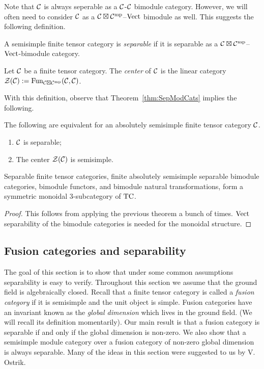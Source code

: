 \documentclass{amsart}
\begin{document}
Note that $\mathcal C$ is always seperable as a $\mathcal C$-$\mathcal C$ bimodule category.  However, we will often need to consider $\mathcal C$ as a $\mathcal C \boxtimes \mathcal C^{\mathrm{mp}}$--$\mathrm{Vect}$ bimodule as well.  This suggests the following definition.

\begin{definition}
	A semisimple finite tensor category is {\em separable} if it is separable as a $\mathcal C \boxtimes \mathcal C^{\mathrm{mp}}$--$\mathrm{Vect}$-bimodule category.  
\end{definition}


\begin{definition}
	Let $\mathcal C$ be a finite tensor category. The {\em center} of $\mathcal C$ is the linear category $\mathcal Z(\mathcal C) := \operatorname{Fun}_{\mathcal C \boxtimes \mathcal C^{\mathrm{mp}}}(\mathcal C, \mathcal C)$.
\end{definition}

With this definition, observe that Theorem~\ref{thm:SepModCats} implies the following.

\begin{corollary} \label{cor:Sep=semisimplecenter}
	The following are equivalent for an absolutely semisimple finite tensor category $\mathcal C$.
	\begin{enumerate}
		\item $\mathcal C$ is separable;
		\item The center $\mathcal Z(\mathcal C)$ is semisimple.
	\end{enumerate} 
\end{corollary}

\begin{theorem} \label{thm:closure-of-separability}
Separable finite tensor categories, finite absolutely semisimple separable bimodule categories, bimodule functors, and bimodule natural transformations, form a symmetric monoidal $3$-subcategory of $\mathrm{TC}$.
\end{theorem}
\begin{proof}
This follows from applying the previous theorem a bunch of times.  $\mathrm{Vect}$ separability of the bimodule categories is needed for the monoidal structure.  
\end{proof}


\subsection{Fusion categories and separability} \label{sec:tc-fusion}

The goal of this section is to show that under some common assumptions separability is easy to verify.  Throughout this section we assume that the ground field is algebraically closed.  Recall that a finite tensor category is called a \emph{fusion category} if it is semisimple and the unit object is simple.  Fusion categories have an invariant known as the \emph{global dimension} which lives in the ground field. (We will recall its definition momentarily).  Our main result is that a fusion category is separable if and only if the global dimension is non-zero.  We also show that a semisimple module category over a fusion category of non-zero global dimension is always separable. Many of the ideas in this section were suggested to us by V. Ostrik. 
\end{document}
